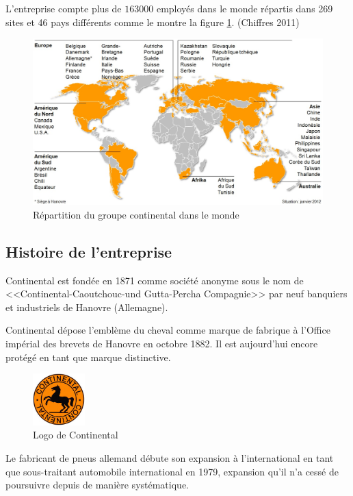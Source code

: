 		 L'entreprise compte plus de $163000$ employés dans le monde répartis dans 269 sites et 46 pays différents comme le montre la figure \ref{fig:repartitionConti}. (Chiffres 2011)
		 \begin{figure}[H]
		 	\centering
		 	\includegraphics[width=13cm]{contents/images/repartitionConti.jpg}
		 	\caption{Répartition du groupe continental dans le monde}
		 	\label{fig:repartitionConti}
		 \end{figure}		 

		\subsection{Histoire de l'entreprise}
		Continental est fondée en 1871 comme société anonyme sous le nom de <<Continental-Caoutchouc-und Gutta-Percha Compagnie>> par neuf banquiers et industriels de Hanovre (Allemagne).

		Continental dépose l'emblème du cheval comme marque de fabrique à l'Office impérial des brevets de Hanovre en octobre 1882. Il est aujourd'hui encore protégé en tant que marque distinctive.
		\begin{figure}[H]
			\centering
			\includegraphics[width=2cm]{contents/images/logo.jpg}
			\caption{Logo de Continental}
			\label{fig:logo}
		\end{figure}

		Le fabricant de pneus allemand débute son expansion à l'international en tant que sous-traitant automobile international en 1979, expansion qu'il n'a cessé de poursuivre depuis de manière systématique.
		
